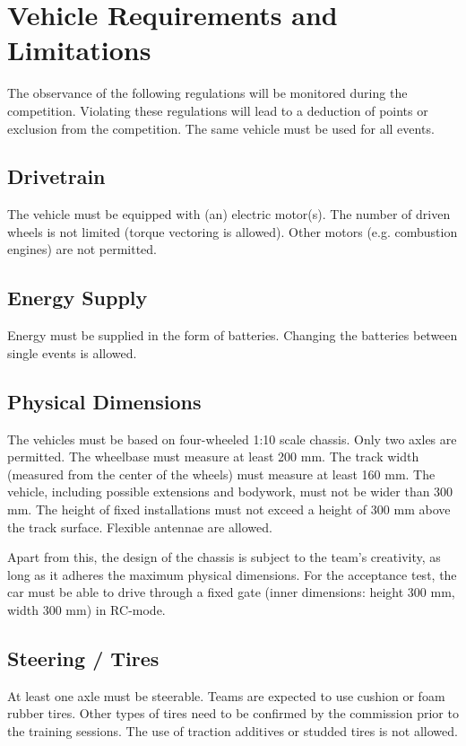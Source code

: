 \chapter{Vehicle Requirements and Limitations}

The observance of the following regulations will be monitored during the
competition. Violating these regulations will lead to a deduction of points or
exclusion from the competition. The same vehicle must be used for all events.

\section{Drivetrain}

The vehicle must be equipped with (an) electric motor(s). The number of driven
wheels is not limited (torque vectoring is allowed). Other motors (e.g.
combustion engines) are not permitted.

\section{Energy Supply}

Energy must be supplied in the form of batteries. Changing the batteries
between single events is allowed.

\section{Physical Dimensions}

The vehicles must be based on four-wheeled 1:10 scale chassis. Only two axles
are permitted. The wheelbase must measure at least 200 mm. The track width
(measured from the center of the wheels) must measure at least 160 mm. The
vehicle, including possible extensions and bodywork, must not be wider than 300
mm. The height of fixed installations must not exceed a height of 300 mm above
the track surface. Flexible antennae are allowed.

Apart from this, the design of the chassis is subject to the team’s creativity,
as long as it adheres the maximum physical dimensions. For the acceptance test,
the car must be able to drive through a fixed gate (inner dimensions: height
300 mm, width 300 mm) in RC-mode.

\section{Steering / Tires}

At least one axle must be steerable. Teams are expected to use cushion or foam
rubber tires. Other types of tires need to be confirmed by the commission prior
to the training sessions. The use of traction additives or studded tires is not
allowed.

